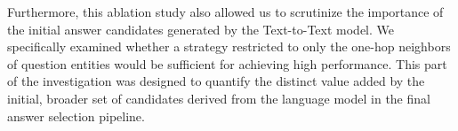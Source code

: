 Furthermore, this ablation study also allowed us to scrutinize the importance of the initial answer candidates generated by the Text-to-Text model. We specifically examined whether a strategy restricted to only the one-hop neighbors of question entities would be sufficient for achieving high performance. This part of the investigation was designed to quantify the distinct value added by the initial, broader set of candidates derived from the language model in the final answer selection pipeline.


